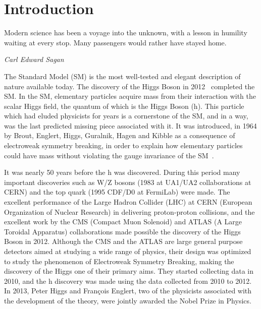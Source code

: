 %
%

\chapter{Introduction}
\epigraph{Modern science has been a voyage into the unknown, with a lesson in humility waiting at every stop. Many passengers would rather have stayed home.}{\textit{Carl Edward Sagan}}
\vskip 0.6in
The Standard Model (SM) is the most well-tested and elegant description of nature available today. The discovery of the Higgs Boson in 2012~\cite{Aad:2012tfa, Chatrchyan:2012ufa, Chatrchyan:2013lba} completed the SM. In the SM, elementary particles acquire mass from their interaction with the scalar Higgs field, the quantum of which is the Higgs Boson (h). This particle which had eluded physicists for years is a cornerstone of the SM, and in a way, was the last predicted missing piece associated with it. It was introduced, in 1964 by Brout, Englert, Higgs, Guralnik, Hagen and Kibble as a consequence of electroweak symmetry breaking, in order to explain how elementary particles could have mass without violating the gauge invariance of the SM~\cite{Englert:1964et,Higgs:1964ia,Higgs:1964pj,Guralnik:1964eu}.

It was nearly 50 years before the h was discovered. During this period many important discoveries such as W/Z bosons (1983 at UA1/UA2 collaborations at CERN) and the top quark (1995 CDF/D0 at FermiLab) were made. The excellent performance of the Large Hadron Collider (LHC) at CERN (European Organization of Nuclear Research) in delivering proton-proton collisions, and the excellent work by the CMS (Compact Muon Solenoid) and ATLAS (A Large Toroidal Apparatus) collaborations made possible the discovery of the Higgs Boson in 2012. Although the CMS and the ATLAS are large general purpose detectors aimed at studying a wide range of physics, their design was optimized to study the phenomenon of Electroweak Symmetry Breaking, making the discovery of the Higgs one of their primary aims. They started collecting data in 2010, and the h discovery was made using the data collected from 2010 to 2012. In 2013, Peter Higgs and François Englert, two of the physicists associated with the development of the theory, were jointly awarded the Nobel Prize in Physics.

